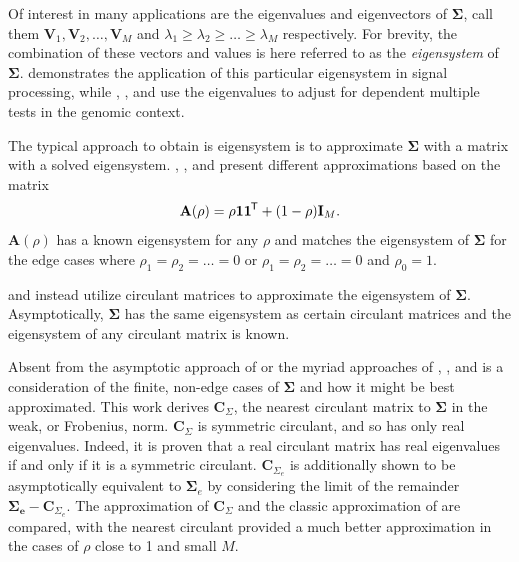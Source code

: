 \documentclass[letterpaper,12pt,oneside,final]{article}
\newcommand{\ve}[1]{\mathbf{#1}}           %
\newcommand{\m}[1]{\mathbf{#1}}               %
\newcommand{\sm}[1]{\boldsymbol{#1}}   %
\newcommand{\tr}[1]{{#1}^{\mkern-1.5mu\mathsf{T}}}              %
\begin{document}
Of interest in many applications are the eigenvalues and eigenvectors of $\sm{\Sigma}$, call them $\ve{V}_1, \ve{V}_2, \dots, \ve{V}_M$ and $\lambda_1 \geq \lambda_2 \geq \dots \geq \lambda_M$ respectively. For brevity, the combination of these vectors and values is here referred to as the \emph{eigensystem} of $\sm{\Sigma}$. \cite{gray2006toeplitz} demonstrates the application of this particular eigensystem in signal processing, while \cite{cheverud2001}, \cite{LiJi2005}, and \cite{Galwey2009} use the eigenvalues to adjust for dependent multiple tests in the genomic context.

The typical approach to obtain is eigensystem is to approximate $\sm{\Sigma}$ with a matrix with a solved eigensystem. \cite{cheverud2001}, \cite{LiJi2005}, and \cite{Galwey2009} present different approximations based on the matrix
\begin{equation} \label{eq:multipleTesting:commonCor}
  \m{A}(\rho) = \rho \ve{1} \tr{\ve{1}} + (1 - \rho) \m{I}_M.
\end{equation}
$\m{A}(\rho)$ has a known eigensystem for any $\rho$ and matches the eigensystem of $\sm{\Sigma}$ for the edge cases where $\rho_1 = \rho_2 = \dots = 0$ or $\rho_1 = \rho_2 = \dots = 0$ and $\rho_0 = 1$.

\cite{gray2006toeplitz} and \cite{grenanderszego1958} instead utilize circulant matrices to approximate the eigensystem of $\sm{\Sigma}$. Asymptotically, $\sm{\Sigma}$ has the same eigensystem as certain circulant matrices and the eigensystem of any circulant matrix is known.

Absent from the asymptotic approach of \cite{gray2006toeplitz} or the myriad approaches of \cite{cheverud2001}, \cite{LiJi2005}, and \cite{Galwey2009} is a consideration of the finite, non-edge cases of $\sm{\Sigma}$ and how it might be best approximated. This work derives $\m{C}_{\Sigma}$, the nearest circulant matrix to $\sm{\Sigma}$ in the weak, or Frobenius, norm. $\m{C}_{\Sigma}$ is symmetric circulant, and so has only real eigenvalues. Indeed, it is proven that a real circulant matrix has real eigenvalues if and only if it is a symmetric circulant. $\m{C}_{\Sigma_e}$ is additionally shown to be asymptotically equivalent to $\sm{\Sigma}_e$ by considering the limit of the remainder $\sm{\Sigma_e} - \m{C}_{\Sigma_e}$. The approximation of $\sm{C}_{\Sigma}$ and the classic approximation of \cite{gray2006toeplitz} are compared, with the nearest circulant provided a much better approximation in the cases of $\rho$ close to 1 and small $M$.
\end{document}

